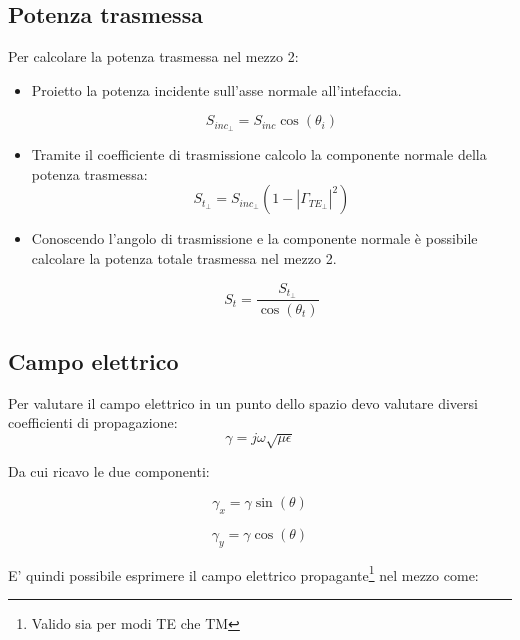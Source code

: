 		\subsection{Potenza trasmessa}

			Per calcolare la potenza trasmessa nel mezzo 2:
			\begin{itemize}
			\item Proietto la potenza incidente sull'asse normale all'intefaccia.

			\begin{equation}
			S_{inc_\perp}=S_{inc}\cos(\theta_i)
			\end{equation}

			\item Tramite il coefficiente di trasmissione calcolo la componente normale della potenza trasmessa:
			\begin{equation}
			S_{t_\perp}=S_{inc_\perp}(1-|\Gamma_{TE_\perp}|^2)
			\end{equation}

			\item Conoscendo l'angolo di trasmissione e la componente normale è possibile calcolare la potenza totale trasmessa nel mezzo 2.

			\begin{equation}
			S_{t}=\frac{S_{t_\perp}}{\cos(\theta_t)}
			\end{equation}
			\end{itemize}
		\subsection{Campo elettrico}

			Per valutare il campo elettrico in un punto dello spazio devo valutare diversi coefficienti di propagazione:
			\begin{equation}
			\gamma=j\omega\sqrt{\mu\epsilon}\end{equation}

			Da cui ricavo le due componenti:

			\begin{equation}
			\gamma_x=\gamma\sin(\theta)
			\end{equation}

			\begin{equation}
			\gamma_y=\gamma\cos(\theta)
			\end{equation}

			E' quindi possibile esprimere il campo elettrico propagante\footnote{Valido sia per modi TE che TM} nel mezzo come:
			
